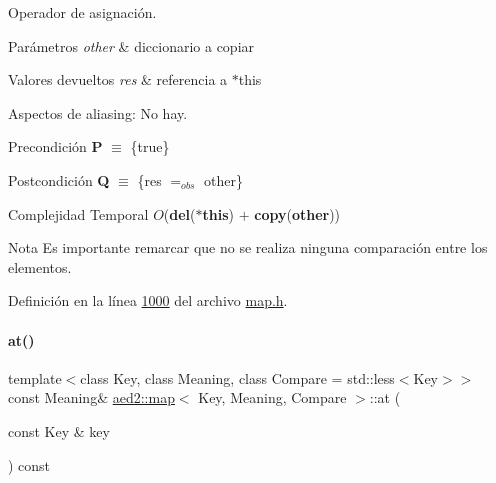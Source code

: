Operador de asignación. 


\begin{DoxyParams}{Parámetros}
{\em other} & diccionario a copiar \\
\hline
\end{DoxyParams}

\begin{DoxyRetVals}{Valores devueltos}
{\em res} & referencia a $\ast$this\\
\hline
\end{DoxyRetVals}
\begin{DoxyParagraph}{Aspectos de aliasing\+:}
No hay.
\end{DoxyParagraph}
\begin{DoxyPrecond}{Precondición}
{\bfseries P} $\equiv$ \{true\} 
\end{DoxyPrecond}
\begin{DoxyPostcond}{Postcondición}
{\bfseries Q} $\equiv$ \{res $=_{obs}$ other\}
\end{DoxyPostcond}

\begin{DoxyDescription}
\item[Complejidad Temporal]$O$({\bfseries del}({\bfseries $\ast$this}) $+$ {\bfseries copy}({\bfseries other}))
\end{DoxyDescription}

\begin{DoxyNote}{Nota}
Es importante remarcar que no se realiza ninguna comparación entre los elementos. 
\end{DoxyNote}


Definición en la línea \hyperlink{map_8h_source_l01000}{1000} del archivo \hyperlink{map_8h_source}{map.\+h}.

\mbox{\label{classaed2_1_1map_a579c9179b42175c23a1013ac7f1b876c_a579c9179b42175c23a1013ac7f1b876c}} 
\paragraph{\texorpdfstring{at()}{at()}\hspace{0.1cm}{\footnotesize\ttfamily [1/2]}}
{\footnotesize\ttfamily template$<$class Key, class Meaning, class Compare = std\+::less$<$\+Key$>$$>$ \\
const Meaning\& \hyperlink{classaed2_1_1map}{aed2\+::map}$<$ Key, Meaning, Compare $>$\+::at (\begin{DoxyParamCaption}\item[{const Key \&}]{key }\end{DoxyParamCaption}) const\hspace{0.3cm}{\ttfamily [inline]}}



